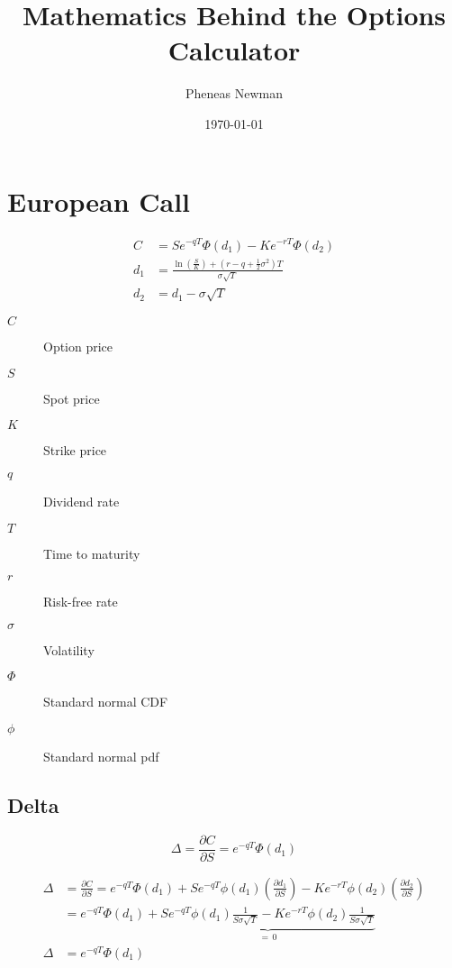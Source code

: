 \documentclass[12pt,a4paper]{article}
\begin{document}
\title{Mathematics Behind the Options Calculator}
\author{Pheneas Newman}
\date{\today}
\maketitle

\section{European Call}

\[
  \begin{aligned}
    C   & = S e^{-qT} \Phi(d_1) - K e^{-rT} \Phi(d_2) \\ 
    d_1 & = \frac{\ln\!\left(\tfrac{S}{K}\right) + (r - q + \tfrac{1}{2}\sigma^2)T}{\sigma \sqrt{T}} \\
    d_2 & = d_1 - \sigma \sqrt{T}
  \end{aligned}
\]

\begin{description}
  \item[$C$] Option price
  \item[$S$] Spot price
  \item[$K$] Strike price
  \item[$q$] Dividend rate
  \item[$T$] Time to maturity
  \item[$r$] Risk-free rate
  \item[$\sigma$] Volatility
  \item[$\Phi$] Standard normal CDF
  \item[$\phi$] Standard normal pdf
\end{description}

\subsection{Delta}
\[
  \boxed{\Delta = \frac{\partial C}{\partial S} = e^{-qT}\Phi(d_1)}
\]

\[
  \begin{aligned}
    \Delta & = \frac{\partial C}{\partial S} = e^{-qT}\Phi(d_1) + Se^{-q T}\phi(d_1)\left(\frac{\partial d_1}{\partial S}\right) - Ke^{-rT}\phi(d_2)\left(\frac{\partial d_2}{\partial S} \right) \\
           & = e^{-qT}\Phi(d_1) + \underbrace{Se^{-qT}\phi(d_1)\frac{1}{S \sigma \sqrt{T}} - Ke^{-rT}\phi(d_2)\frac{1}{S \sigma \sqrt{T}}}_{=\,0} \\
    \Delta & = e^{-qT}\Phi(d_1)
  \end{aligned}
\]
\end{document}
